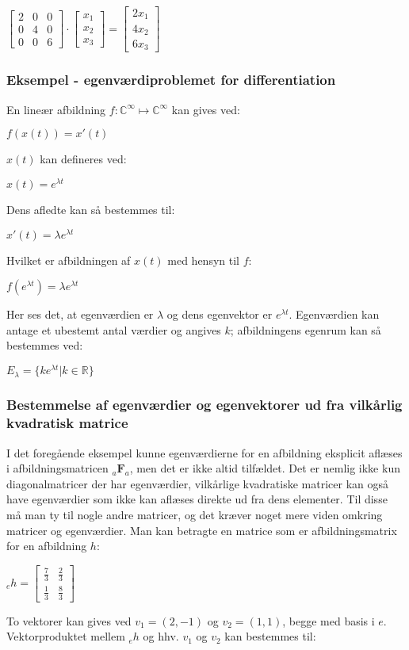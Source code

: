\documentclass{article}
\newcommand{\cent}[1]{\begin{center}#1\end{center}}
\newcommand{\afb}[3]{\ensuremath{_#1 \textbf{#2}_#3}}
\newcommand{\vek}[3]{\ensuremath{\begin{bmatrix} #1\\ #2\\ #3\end{bmatrix}}}
\newcommand{\mediumMatrix}[9]{\ensuremath{
		\begin{bmatrix}
			#1 & #2 & #3 \\
			#4 & #5 & #6 \\
			#7 & #8 & #9
		\end{bmatrix}}}
\newcommand{\smallMatrix}[4]{\ensuremath{\begin{bmatrix}
			#1 & #2 \\
			#3 & #4
\end{bmatrix}}}
\begin{document}
	\cent{$ \mediumMatrix{2}{0}{0}{0}{4}{0}{0}{0}{6} \cdot \vek{x_1}{x_2}{x_3} = \vek{2x_1}{4x_2}{6x_3} $}
	
	\subsubsection{Eksempel - egenværdiproblemet for differentiation}
	
	En lineær afbildning $ f : \mathbb{C}^\infty \mapsto \mathbb{C}^\infty $ kan gives ved:
	
	\cent{$ f(x(t)) = x'(t) $}
	
	$x(t)$ kan defineres ved:
	
	\cent{$ x(t)= e^{\lambda t}$}
	
	Dens afledte kan så bestemmes til:
	
	\cent{$x'(t)=\lambda  e^{\lambda t}$}
	
	Hvilket er afbildningen af $ x(t) $ med hensyn til $ f $:
	
	\cent{$ f(e^{\lambda t}) = \lambda  e^{\lambda t} $}
	
	Her ses det, at egenværdien er $\lambda$ og dens egenvektor er $e^{\lambda t}$. Egenværdien kan antage et ubestemt antal værdier og angives $k$; afbildningens egenrum kan så bestemmes ved:
	
	\cent{$E_\lambda = \{ke^{\lambda t} | k \in \mathbb{R}\} $}
	
	\subsubsection{Bestemmelse af egenværdier og egenvektorer ud fra vilkårlig kvadratisk matrice}
	
	I det foregående eksempel kunne egenværdierne for en afbildning eksplicit aflæses i afbildningsmatricen \afb{a}{F}{a}, men det er ikke altid tilfældet. Det er nemlig ikke kun diagonalmatricer der har egenværdier, vilkårlige kvadratiske matricer kan også have egenværdier som ikke kan aflæses direkte ud fra dens elementer. Til disse må man ty til nogle andre matricer, og det kræver noget mere viden omkring matricer og egenværdier. \newline
	Man kan betragte en matrice som er afbildningsmatrix for en afbildning $h$:
	
	\cent{$ _eh = \smallMatrix{\frac{7}{3}}{\frac{2}{3}}{\frac{1}{3}}{\frac{8}{3}}$}
	
	To vektorer kan gives ved $v_1=(2,-1)$ og $v_2=(1,1)$, begge med basis i $e$. Vektorproduktet mellem $_eh$ og hhv. $v_1$ og $v_2$ kan bestemmes til:
	
\end{document}
